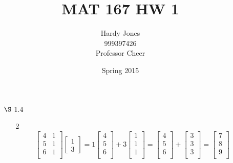 \documentclass[12pt,letterpaper]{article}
\title{MAT 167 HW 1\vspace{-2ex}}
\author{Hardy Jones\\
        999397426\\
        Professor Cheer\vspace{-2ex}}
\date{Spring 2015}
\begin{document}
  \maketitle

  \begin{enumerate}
    \item [$\S$ 1.4]
      \begin{enumerate}
        \item [2]
          \[
            \begin{bmatrix}
              4 & 1 \\
              5 & 1 \\
              6 & 1 \\
            \end{bmatrix}
            \begin{bmatrix}
              1 \\
              3
            \end{bmatrix}
            =
            1
            \begin{bmatrix}
              4 \\
              5 \\
              6 \\
            \end{bmatrix}
            + 3
            \begin{bmatrix}
              1 \\
              1 \\
              1 \\
            \end{bmatrix}
            =
            \begin{bmatrix}
              4 \\
              5 \\
              6 \\
            \end{bmatrix}
            +
            \begin{bmatrix}
              3 \\
              3 \\
              3 \\
            \end{bmatrix}
            =
            \begin{bmatrix}
              7 \\
              8 \\
              9 \\
            \end{bmatrix}
\]
\end{enumerate}
\end{enumerate}
\end{document}
